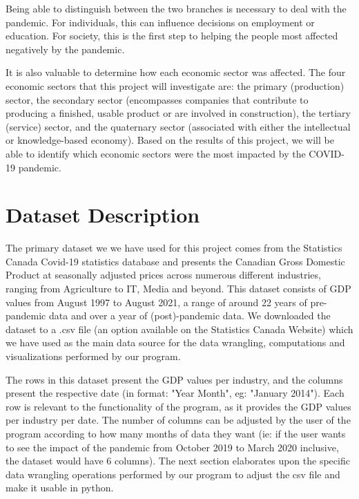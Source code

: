 \documentclass[fontsize=11pt]{article}
\begin{document}
Being able to distinguish between the two branches is necessary to deal with the pandemic. For individuals, this can influence decisions on employment or education. For society,  this is the first step to helping the people most affected negatively by the pandemic.

It is also valuable to determine how each economic sector was affected. The four economic sectors that this project will investigate are: the primary (production) sector, the secondary sector (encompasses companies that contribute to producing a finished, usable product or are involved in construction), the tertiary (service) sector, and the quaternary sector (associated with either the intellectual or knowledge-based economy). Based on the results of this project, we will be able to identify which economic sectors were the most impacted by the COVID-19 pandemic.  

\section{Dataset Description}

The primary dataset we we have used for this project comes from the Statistics Canada Covid-19 statistics database and presents the Canadian Gross Domestic Product at seasonally adjusted prices across numerous different industries, ranging from Agriculture to IT, Media and beyond. This dataset consists of GDP values from August 1997 to August 2021, a range of around 22 years of pre-pandemic data and over a year of (post)-pandemic data. We downloaded the dataset to a .csv file (an option available on the Statistics Canada Website) which we have used as the main data source for the data wrangling, computations and visualizations performed by our program.

\medskip

The rows in this dataset present the GDP values per industry, and the columns present the respective date (in format: "Year Month", eg: {"January 2014"}). Each row is relevant to the functionality of the program, as it provides the GDP values per industry per date. The number of columns can be adjusted by the user of the program according to how many months of data they want (ie: if the user wants to see the impact of the pandemic from October 2019 to March 2020 inclusive, the dataset would have 6 columns). The next section elaborates upon the specific data wrangling operations performed by our program to adjust the csv file and make it usable in python.
\end{document}
